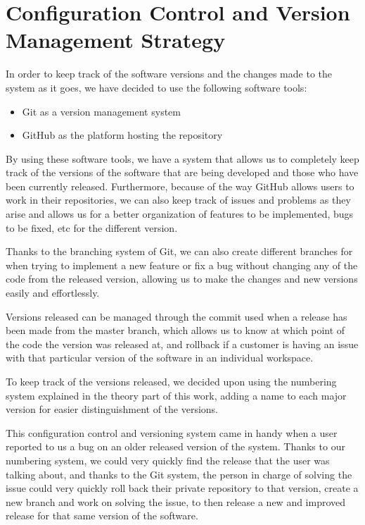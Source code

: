 \chapter{Configuration Control and Version Management Strategy}
In order to keep track of the software versions and the changes made to the system as it goes, we have decided to use the following software tools:

\begin{itemize}
    \item Git as a version management system
    \item GitHub as the platform hosting the repository
\end{itemize}

By using these software tools, we have a system that allows us to completely keep track of the versions of the software that are being developed and those who have been currently released. Furthermore, because of the way GitHub allows users to work in their repositories, we can also keep track of issues and problems as they arise and allows us for a better organization of features to be implemented, bugs to be fixed, etc for the different version.

Thanks to the branching system of Git, we can also create different branches for when trying to implement a new feature or fix a bug without changing any of the code from the released version, allowing us to make the changes and new versions easily and effortlessly.

Versions released can be managed through the commit used when a release has been made from the master branch, which allows us to know at which point of the code the version was released at, and rollback if a customer is having an issue with that particular version of the software in an individual workspace.

To keep track of the versions released, we decided upon using the numbering system explained in the theory part of this work, adding a name to each major version for easier distinguishment of the versions.


This configuration control and versioning system came in handy when a user reported to us a bug on an older released version of the system. Thanks to our numbering system, we could very quickly find the release that the user was talking about, and thanks to the Git system, the person in charge of solving the issue could very quickly roll back their private repository to that version, create a new branch and work on solving the issue, to then release a new and improved release for that same version of the software.